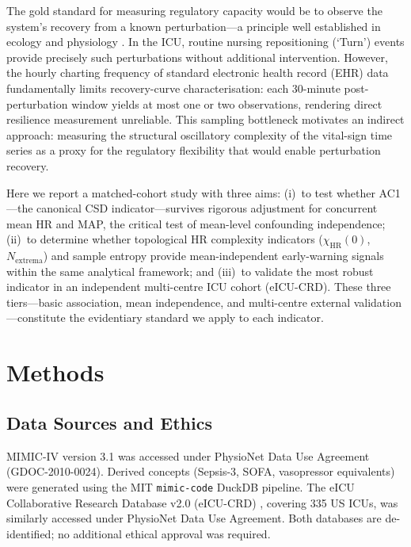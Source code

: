 \documentclass[12pt,a4paper]{article}
\begin{document}
The gold standard for measuring regulatory capacity would be to observe the
system's recovery from a known perturbation---a principle well established
in ecology \citep{scheffer2009} and physiology \citep{rector2021}.
In the ICU, routine nursing repositioning (`Turn') events provide precisely
such perturbations without additional intervention.
However, the hourly charting frequency of standard electronic health record
(EHR) data fundamentally limits recovery-curve characterisation: each
30-minute post-perturbation window yields at most one or two observations,
rendering direct resilience measurement unreliable.
This sampling bottleneck motivates an indirect approach: measuring the
structural oscillatory complexity of the vital-sign time series as a proxy
for the regulatory flexibility that would enable perturbation recovery.

Here we report a matched-cohort study with three aims:
(i)~to test whether AC1---the canonical CSD indicator---survives rigorous
adjustment for concurrent mean HR and MAP, the critical test of mean-level
confounding independence;
(ii)~to determine whether topological HR complexity indicators
($\chi_{\text{HR}}(0)$, $N_{\text{extrema}}$) and sample entropy provide
mean-independent early-warning signals within the same analytical framework;
and (iii)~to validate the most robust indicator in an independent
multi-centre ICU cohort (eICU-CRD).
These three tiers---basic association, mean independence, and multi-centre
external validation---constitute the evidentiary standard we apply to each
indicator.

\section{Methods}
\label{sec:methods}

\subsection{Data Sources and Ethics}
\label{sec:data}

MIMIC-IV version 3.1 \citep{johnson2023,johnson2024mimiciv} was accessed
under PhysioNet Data Use Agreement (GDOC-2010-0024).
Derived concepts (Sepsis-3, SOFA, vasopressor equivalents) were generated
using the MIT \texttt{mimic-code} DuckDB pipeline.
The eICU Collaborative Research Database v2.0 (eICU-CRD)
\citep{pollard2018}, covering 335 US ICUs, was similarly accessed under
PhysioNet Data Use Agreement.
Both databases are de-identified; no additional ethical approval was required.
\end{document}
